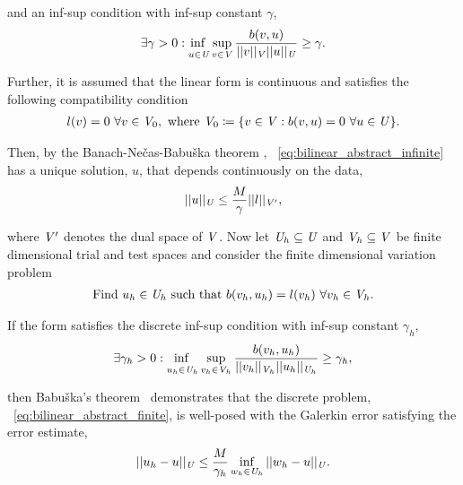 and an inf-sup condition with inf-sup constant $\gamma$,
\begin{align} \label{eq:inf_sup_infinite}
\exists \gamma > 0 :
\adjustlimits\inf_{u\in\fspace{U}} \sup_{v\in\fspace{V}}
\frac{b(v,u)}{||v||_{\fspace{V}}||u||_{\fspace{U}}} \ge \gamma.
\end{align}

Further, it is assumed that the linear form is continuous and satisfies the following compatibility condition
\begin{align}
l(v) = 0\ \forall v \in \mathit{{{V}}}_0,\ \text{where}\ \mathit{{{V}}}_0 \coloneqq \{v \in \mathit{{{V}}} : b(v,u) = 0\ \forall u
\in \mathit{{{U}}} \}.
\end{align}

Then, by the Banach-Ne\v{c}as-Babu\v{s}ka theorem ,
~\eqref{eq:bilinear_abstract_infinite} has a unique solution, $u$, that depends continuously on the data,
\begin{align}
||u||_{\mathit{{{U}}}} \le \frac{M}{\gamma} ||l||_{\mathit{{{V}}}'},
\end{align}

where $\mathit{{{V}}}'$ denotes the dual space of $\mathit{{{V}}}$. Now let $\mathit{{{U}}}_h \subseteq \mathit{{{U}}}$ and $\mathit{{{V}}}_h
\subseteq \mathit{{{V}}}$ be finite dimensional trial and test spaces and consider the finite dimensional variation problem
\begin{align} \label{eq:bilinear_abstract_finite}
\text{Find}\ u_h \in \mathit{{{U}}}_h\ \text{such that}\
b(v_h,u_h) = l(v_h)\ \forall v_h \in \mathit{{{V}}}_h.
\end{align}

If the form satisfies the discrete inf-sup condition with inf-sup constant $\gamma_h$,
\begin{align} \label{eq:inf_sup_finite}
\exists \gamma_h > 0 :
\adjustlimits\inf_{u_h\in\fspace{U}_h} \sup_{v_h\in\fspace{V}_h}
\frac{b(v_h,u_h)}{||v_h||_{\fspace{V}_h}||u_h||_{\fspace{U}_h}} \ge \gamma_h,
\end{align}

then Babu\v{s}ka's theorem~\cite[Theorem ]{Babuska1971} demonstrates that the discrete problem,
~\eqref{eq:bilinear_abstract_finite}, is well-posed with the Galerkin error satisfying the error estimate,
\begin{align} \label{eq:abstract_dpg_error}
||u_h-u||_{\mathit{{{U}}}} \le \frac{M}{\gamma_h} \inf_{w_h \in \mathit{{{U}}}_h} ||w_h-u||_{\mathit{{{U}}}}.
\end{align}


